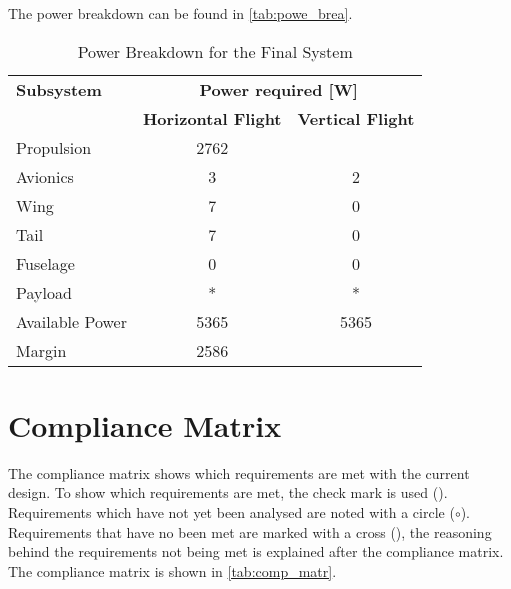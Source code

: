 The power breakdown can be found in \autoref{tab:powe_brea}. 

\begin{table}[htb]
    \centering
    \caption{Power Breakdown for the Final System}
    \label{tab:powe_brea}
    \begin{tabular}{lcc}
    \toprule
    \textbf{Subsystem} & \multicolumn{2}{c}{\textbf{Power required [W]}} \\
    \hdashline
    & \textbf{Horizontal Flight} & \textbf{Vertical Flight} \\ \midrule 
    Propulsion & 2762& \\\hdashline
    Avionics & 3 & 2\\\hdashline
    Wing & 7 & 0\\\hdashline
    Tail &7 &0\\\hdashline
    Fuselage &0&0\\\hdashline
    Payload &*&*\\
    \midrule
    Available Power &5365&5365\\\midrule
    Margin &2586 & \\    
    \bottomrule
    \end{tabular}
\end{table}


\section{Compliance Matrix}
\label{sec:comp_matr}

The compliance matrix shows which requirements are met with the current design. To show which requirements are met, the check mark is used (\cmark). Requirements which have not yet been analysed are noted with a circle ($\circ$). Requirements that have no been met are marked with a cross (), the reasoning behind the requirements not being met is explained after the compliance matrix. The compliance matrix is shown in \autoref{tab:comp_matr}.


